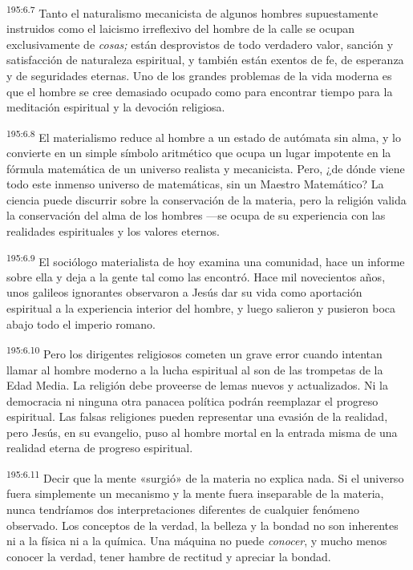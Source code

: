 \par 
\textsuperscript{195:6.7} Tanto el naturalismo mecanicista de algunos hombres supuestamente instruidos como el laicismo irreflexivo del hombre de la calle se ocupan exclusivamente de \textit{cosas;} están desprovistos de todo verdadero valor, sanción y satisfacción de naturaleza espiritual, y también están exentos de fe, de esperanza y de seguridades eternas. Uno de los grandes problemas de la vida moderna es que el hombre se cree demasiado ocupado como para encontrar tiempo para la meditación espiritual y la devoción religiosa.

\par 
\textsuperscript{195:6.8} El materialismo reduce al hombre a un estado de autómata sin alma, y lo convierte en un simple símbolo aritmético que ocupa un lugar impotente en la fórmula matemática de un universo realista y mecanicista. Pero, ¿de dónde viene todo este inmenso universo de matemáticas, sin un Maestro Matemático? La ciencia puede discurrir sobre la conservación de la materia, pero la religión valida la conservación del alma de los hombres ---se ocupa de su experiencia con las realidades espirituales y los valores eternos.

\par 
\textsuperscript{195:6.9} El sociólogo materialista de hoy examina una comunidad, hace un informe sobre ella y deja a la gente tal como las encontró. Hace mil novecientos años, unos galileos ignorantes observaron a Jesús dar su vida como aportación espiritual a la experiencia interior del hombre, y luego salieron y pusieron boca abajo todo el imperio romano.

\par 
\textsuperscript{195:6.10} Pero los dirigentes religiosos cometen un grave error cuando intentan llamar al hombre moderno a la lucha espiritual al son de las trompetas de la Edad Media. La religión debe proveerse de lemas nuevos y actualizados. Ni la democracia ni ninguna otra panacea política podrán reemplazar el progreso espiritual. Las falsas religiones pueden representar una evasión de la realidad, pero Jesús, en su evangelio, puso al hombre mortal en la entrada misma de una realidad eterna de progreso espiritual.

\par 
\textsuperscript{195:6.11} Decir que la mente «surgió» de la materia no explica nada. Si el universo fuera simplemente un mecanismo y la mente fuera inseparable de la materia, nunca tendríamos dos interpretaciones diferentes de cualquier fenómeno observado. Los conceptos de la verdad, la belleza y la bondad no son inherentes ni a la física ni a la química. Una máquina no puede \textit{conocer}, y mucho menos conocer la verdad, tener hambre de rectitud y apreciar la bondad.

